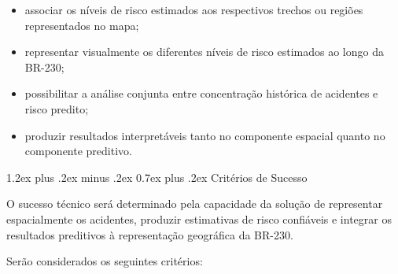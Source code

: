 \documentclass[11pt,a4paper]{article}
\makeatletter
\renewcommand\subsection{
\@startsection{subsection}{2}{0pt}%
{1.2ex plus .2ex minus .2ex}%
{0.7ex plus .2ex}%
{\normalfont\large\bfseries}
}
\makeatother
\begin{document}
\begin{itemize}
    \item associar os níveis de risco estimados aos respectivos trechos ou regiões representados no mapa;

    \item representar visualmente os diferentes níveis de risco estimados ao longo da BR-230;

    \item possibilitar a análise conjunta entre concentração histórica de acidentes e risco predito;

    \item produzir resultados interpretáveis tanto no componente espacial quanto no componente preditivo.

\end{itemize}


\subsection{Critérios de Sucesso}

O sucesso técnico será determinado pela capacidade da solução de representar espacialmente os acidentes, produzir estimativas de risco confiáveis e integrar os resultados preditivos à representação geográfica da BR-230.

Serão considerados os seguintes critérios:
\end{document}
